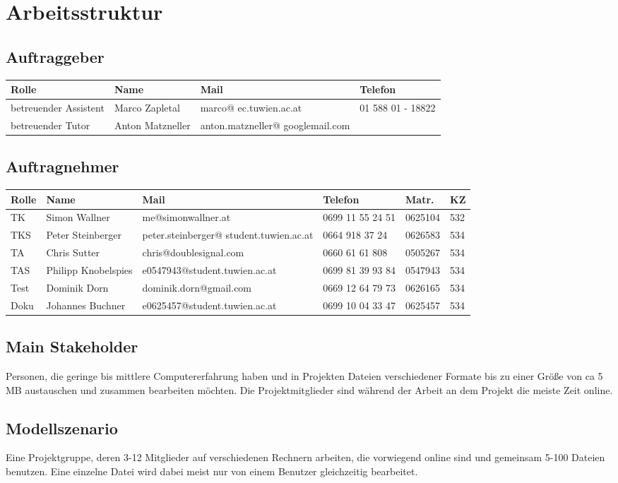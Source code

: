
\section{Arbeitsstruktur}
\subsection{Auftraggeber}
\begin{tabular}{ | l | l | p{3.5cm} | p{4cm} |}
\hline
\textbf{Rolle} & \textbf{Name} & \textbf{Mail} & \textbf{Telefon} \\
\hline
betreuender Assistent & Marco Zapletal & marco@ ec.tuwien.ac.at & 01 588 01 - 18822 \\
\hline
betreuender Tutor & Anton Matzneller & anton.matzneller@ googlemail.com &  \\
\hline
\end{tabular}

\subsection{Auftragnehmer}
\begin{tabular}{ | l | l | p{5.5cm} | p{1.7cm} | l | l |}
\hline
\textbf{Rolle} & \textbf{Name} & \textbf{Mail} & \textbf{Telefon} & \textbf{Matr.} & \textbf{KZ} \\
\hline
TK & Simon Wallner & me@simonwallner.at & 0699 11 55 24 51 & 0625104 & 532 \\
\hline
TKS & Peter Steinberger & peter.steinberger@ student.tuwien.ac.at & 0664 918 37 24 & 0626583 & 534 \\
\hline
TA & Chris Sutter & chris@doublesignal.com & 0660 61 61 808 & 0505267 & 534 \\
\hline
TAS & Philipp Knobelspies & e0547943@student.tuwien.ac.at & 0699 81 39 93 84 & 0547943 & 534 \\
\hline
Test & Dominik Dorn & dominik.dorn@gmail.com & 0669 12 64 79 73 & 0626165 & 534 \\
\hline
Doku & Johannes Buchner & e0625457@student.tuwien.ac.at & 0699 10 04 33 47 & 0625457 & 534 \\
\hline
\end{tabular}

\subsection{Main Stakeholder}
Personen, die geringe bis mittlere Computererfahrung haben und in Projekten Dateien verschiedener Formate bis zu einer Größe von ca 5 MB austauschen und zusammen bearbeiten möchten. Die Projektmitglieder sind während der Arbeit an dem Projekt die meiste Zeit online.
\subsection{Modellszenario}

Eine Projektgruppe, deren 3-12 Mitglieder auf verschiedenen Rechnern arbeiten, die vorwiegend online sind und gemeinsam 5-100 Dateien benutzen. Eine einzelne Datei wird dabei meist nur von einem Benutzer gleichzeitig bearbeitet.
